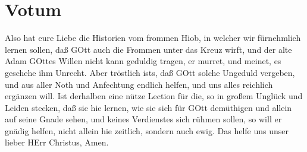 \section{Votum}

Also hat eure Liebe die Historien vom frommen Hiob, in welcher wir fürnehmlich lernen sollen, daß GOtt auch die Frommen unter das Kreuz wirft, und der alte Adam GOttes Willen nicht kann geduldig tragen, er murret, und meinet, es geschehe ihm Unrecht. Aber tröstlich ists, daß GOtt solche Ungeduld vergeben, und aus aller Noth und Anfechtung endlich helfen, und uns alles reichlich ergänzen will. Ist derhalben eine nütze Lection für die, so in großem Unglück und Leiden stecken, daß sie hie lernen, wie sie sich für GOtt demüthigen und allein auf seine Gnade sehen, und keines Verdienstes sich rühmen sollen, so will er gnädig helfen, nicht allein hie zeitlich, sondern auch ewig. Das helfe uns unser lieber HErr Christus, Amen.
